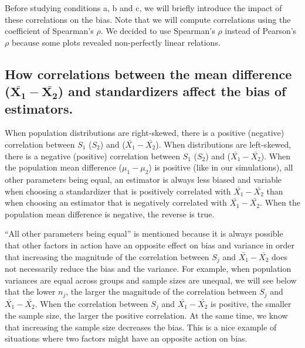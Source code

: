 \documentclass[
  english,
  man,mask,floatsintext]{apa6}
\begin{document}
Before studying conditions a, b and c, we will briefly introduce the impact of these correlations on the bias. Note that we will compute correlations using the coefficient of Spearman's \(\rho\). We decided to use Spearman's \(\rho\) instead of Pearson's \(\rho\) because some plots revealed non-perfectly linear relations.

\hypertarget{how-correlations-between-the-mean-difference-bmbarx_1-barx_2-and-standardizers-affect-the-bias-of-estimators.}{%
\subsection{\texorpdfstring{How correlations between the mean difference (\(\bm{\bar{X_1}-\bar{X_2}}\)) and standardizers affect the bias of estimators.}{How correlations between the mean difference (\textbackslash bm\{\textbackslash bar\{X\_1\}-\textbackslash bar\{X\_2\}\}) and standardizers affect the bias of estimators.}}\label{how-correlations-between-the-mean-difference-bmbarx_1-barx_2-and-standardizers-affect-the-bias-of-estimators.}}

When population distributions are right-skewed, there is a positive (negative) correlation between \(S_1\) (\(S_2\)) and (\(\bar{X_1}-\bar{X_2}\)). When distributions are left-skewed, there is a negative (positive) correlation between \(S_1\) (\(S_2\)) and (\(\bar{X_1}-\bar{X_2}\)). When the population mean difference (\(\mu_1-\mu_2\)) is positive (like in our simulations), all other parameters being equal, an estimator is always less biased and variable when choosing a standardizer that is positively correlated with \(\bar{X_1}-\bar{X_2}\) than when choosing an estimator that is negatively correlated with \(\bar{X_1}-\bar{X_2}\). When the population mean difference is negative, the reverse is true.

``All other parameters being equal'' is mentioned because it is always possible that other factors in action have an opposite effect on bias and variance in order that increasing the magnitude of the correlation between \(S_j\) and \(\bar{X_1}-\bar{X_2}\) does not necessarily reduce the bias and the variance. For example, when population variances are equal across groups and sample sizes are unequal, we will see below that the lower \(n_j\), the larger the magnitude of the correlation between \(S_j\) and \(\bar{X_1}-\bar{X_2}\). When the correlation between \(S_j\) and \(\bar{X_1}-\bar{X_2}\) is positive, the smaller the sample size, the larger the positive correlation. At the same time, we know that increasing the sample size decreases the bias. This is a nice example of situations where two factors might have an opposite action on bias.
\end{document}
